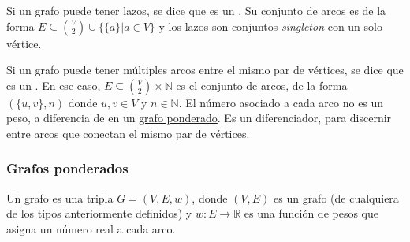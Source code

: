 Si un grafo puede tener lazos, se dice que es un . Su conjunto de arcos es de la forma \(E \subseteq \binom{V}{2} \cup \{\{a\}|a\in V\}\) y los lazos son conjuntos \textit{singleton} con un solo vértice.

Si un grafo puede tener múltiples arcos entre el mismo par de vértices, se dice que es un . En ese caso, \(E \subseteq \binom{V}{2} \times \mathbb{N}\) es el conjunto de arcos, de la forma \((\{u, v\}, n)\) donde \(u,v\in V\) y \(n \in \mathbb{N}\). El número asociado a cada arco no es un peso, a diferencia de en un \hyperref[sec:grafos_ponderados]{grafo ponderado}. Es un diferenciador, para discernir entre arcos que conectan el mismo par de vértices.

\subsubsection{Grafos ponderados}
\label{sec:grafos_ponderados}

Un grafo  es una tripla \(G = (V, E, w)\), donde \((V, E)\) es un grafo (de cualquiera de los tipos anteriormente definidos) y \(w\colon E \to \mathbb{R}\) es una función de pesos que asigna un número real a cada arco.
